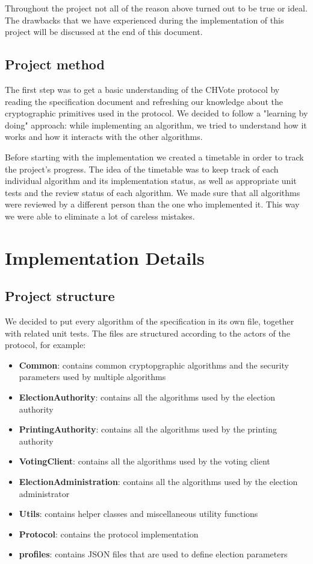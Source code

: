 \documentclass[a4paper,12pt]{report}
\begin{document}
Throughout the project not all of the reason above turned out to be true or ideal. The drawbacks that we have experienced during the implementation of this project will be discussed at the end of this document.

\section{Project method}
The first step was to get a basic understanding of the CHVote protocol by reading the specification document and refreshing our knowledge about the cryptographic primitives used in the protocol. We decided to follow a "learning by doing" approach: while implementing an algorithm, we tried to understand how it works and how it interacts with the other algorithms.

Before starting with the implementation we created a timetable in order to track the project's progress. The idea of the timetable was to keep track of each individual algorithm and its implementation status, as well as appropriate unit tests and the review status of each algorithm. We made sure that all algorithms were reviewed by a different person than the one who implemented it. This way we were able to eliminate a lot of careless mistakes.

\chapter{Implementation Details}
\section{Project structure}
We decided to put every algorithm of the specification in its own file, together with related unit tests. The files are structured according to the actors of the protocol, for example:

\begin{itemize}
	\item \textbf{Common}: contains common cryptopgraphic algorithms and the security parameters used by multiple algorithms
	\item \textbf{ElectionAuthority}: contains all the algorithms used by the election authority
	\item \textbf{PrintingAuthority}: contains all the algorithms used by the printing authority
	\item \textbf{VotingClient}: contains all the algorithms used by the voting client
	\item \textbf{ElectionAdministration}: contains all the algorithms used by the election administrator
	\item \textbf{Utils}: contains helper classes and miscellaneous utility functions
	\item \textbf{Protocol}: contains the protocol implementation
	\item \textbf{profiles}: contains JSON files that are used to define election parameters
\end{itemize}
\end{document}
